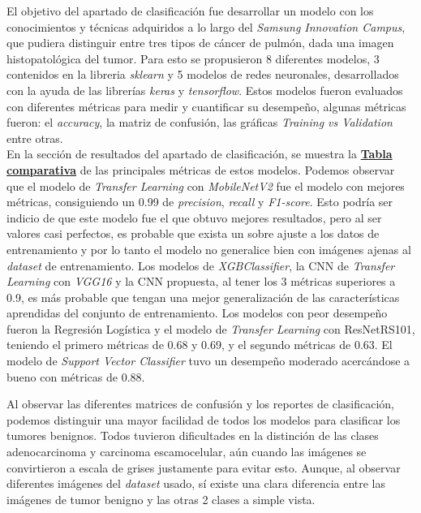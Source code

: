 El objetivo del apartado de clasificación fue desarrollar un modelo con los conocimientos y técnicas adquiridos a lo largo del \textit{Samsung Innovation Campus}, que pudiera distinguir entre tres tipos de cáncer de pulmón, dada una imagen histopatológica del tumor. Para esto se propusieron 8 diferentes modelos, 3 contenidos en la libreria \textit{sklearn} y 5 modelos de redes neuronales, desarrollados con la ayuda de las librerías \textit{keras} y \textit{tensorflow}. Estos modelos fueron evaluados con diferentes métricas para medir y cuantificar su desempeño, algunas métricas fueron: el \textit{accuracy}, la matriz de confusión, las gráficas \textit{Training vs Validation} entre otras. \\

En la sección de resultados del apartado de clasificación, se muestra la \hyperref[tabla:resultados_modelos]{\textbf{Tabla comparativa}} de las principales métricas de estos modelos. Podemos observar que el modelo de \textit{Transfer Learning} con \textit{MobileNetV2} fue el modelo con mejores métricas, consiguiendo un 0.99 de \textit{precision}, \textit{recall} y \textit{F1-score}. Esto podría ser indicio de que este modelo fue el que obtuvo mejores resultados, pero al ser valores casi perfectos, es probable que exista un sobre ajuste a los datos de entrenamiento y por lo tanto el modelo no generalice bien con imágenes ajenas al \textit{dataset} de entrenamiento. Los modelos de \textit{XGBClassifier}, la CNN de \textit{Transfer Learning} con \textit{VGG16} y la CNN propuesta, al tener los 3 métricas superiores a 0.9, es más probable que tengan una mejor generalización de las características aprendidas del conjunto de entrenamiento. Los modelos con peor desempeño fueron la Regresión Logística y el modelo de \textit{Transfer Learning} con ResNetRS101, teniendo el primero métricas de 0.68 y 0.69, y el segundo métricas de 0.63. El modelo de \textit{Support Vector Classifier} tuvo un desempeño moderado acercándose a bueno con métricas de 0.88.

Al observar las diferentes matrices de confusión y los reportes de clasificación, podemos distinguir una mayor facilidad de todos los modelos para clasificar los tumores benignos. Todos tuvieron dificultades en la distinción de las clases adenocarcinoma y carcinoma escamocelular, aún cuando las imágenes se convirtieron a escala de grises justamente para evitar esto. Aunque, al observar diferentes imágenes del \textit{dataset} usado, sí existe una clara diferencia entre las imágenes de tumor benigno y las otras 2 clases a simple vista. 

